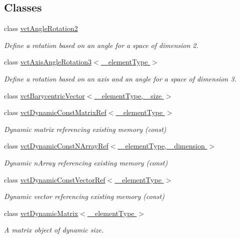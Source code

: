 \subsection*{Classes}
\begin{DoxyCompactItemize}
\item 
class \hyperlink{classvct_angle_rotation2}{vct\+Angle\+Rotation2}
\begin{DoxyCompactList}\small\item\em Define a rotation based on an angle for a space of dimension 2. \end{DoxyCompactList}\item 
class \hyperlink{classvct_axis_angle_rotation3}{vct\+Axis\+Angle\+Rotation3$<$ \+\_\+element\+Type $>$}
\begin{DoxyCompactList}\small\item\em Define a rotation based on an axis and an angle for a space of dimension 3. \end{DoxyCompactList}\item 
class \hyperlink{classvct_barycentric_vector}{vct\+Barycentric\+Vector$<$ \+\_\+element\+Type, \+\_\+size $>$}
\item 
class \hyperlink{classvct_dynamic_const_matrix_ref}{vct\+Dynamic\+Const\+Matrix\+Ref$<$ \+\_\+element\+Type $>$}
\begin{DoxyCompactList}\small\item\em Dynamic matrix referencing existing memory (const) \end{DoxyCompactList}\item 
class \hyperlink{classvct_dynamic_const_n_array_ref}{vct\+Dynamic\+Const\+N\+Array\+Ref$<$ \+\_\+element\+Type, \+\_\+dimension $>$}
\begin{DoxyCompactList}\small\item\em Dynamic n\+Array referencing existing memory (const) \end{DoxyCompactList}\item 
class \hyperlink{classvct_dynamic_const_vector_ref}{vct\+Dynamic\+Const\+Vector\+Ref$<$ \+\_\+element\+Type $>$}
\begin{DoxyCompactList}\small\item\em Dynamic vector referencing existing memory (const) \end{DoxyCompactList}\item 
class \hyperlink{classvct_dynamic_matrix}{vct\+Dynamic\+Matrix$<$ \+\_\+element\+Type $>$}
\begin{DoxyCompactList}\small\item\em A matrix object of dynamic size. \end{DoxyCompactList}\item 

\end{DoxyCompactItemize}
